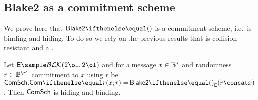 \subsection{Blake2 as a commitment scheme}\label{appendix:blake:proofs:comm}

We prove here that $\blake{2}{}$ is a commitment scheme, i.e.~is binding and hiding. To do so we rely on the previous results that  is collision resistant and a \prf.

\begin{theorem}
    Let $\Enc\sample \blockSet (2\ol, 2\ol) $ and for a message $x \in \mathbb{B}^{*}$ and randomness $r \in \BB^{\rl}$ commitment to $x$ using $r$ be $\comm.\commit{x}{r} = \blake{2}{}_\Enc (r \concat x)$.
    Then $\mathsf{ComSch}$ is hiding and binding.


\end{theorem}
